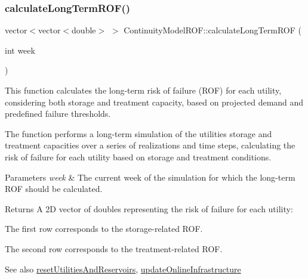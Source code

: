 \subsubsection{\texorpdfstring{calculate\+Long\+Term\+R\+O\+F()}{calculateLongTermROF()}}
{\footnotesize\ttfamily vector$<$vector$<$double$>$ $>$ Continuity\+Model\+R\+O\+F\+::calculate\+Long\+Term\+R\+OF (\begin{DoxyParamCaption}\item[{int}]{week }\end{DoxyParamCaption})}



This function calculates the long-\/term risk of failure (R\+OF) for each utility, considering both storage and treatment capacity, based on projected demand and predefined failure thresholds. 

The function performs a long-\/term simulation of the utilities\textquotesingle{} storage and treatment capacities over a series of realizations and time steps, calculating the risk of failure for each utility based on storage and treatment conditions.


\begin{DoxyParams}{Parameters}
{\em week} & The current week of the simulation for which the long-\/term R\+OF should be calculated.\\
\hline
\end{DoxyParams}
\begin{DoxyReturn}{Returns}
A 2D vector of doubles representing the risk of failure for each utility\+:
\begin{DoxyItemize}
\item The first row corresponds to the storage-\/related R\+OF.
\item The second row corresponds to the treatment-\/related R\+OF.
\end{DoxyItemize}
\end{DoxyReturn}
\begin{DoxySeeAlso}{See also}
\mbox{\hyperlink{classContinuityModelROF_acd72d71a29cef49c4de3d111378b76c7}{reset\+Utilities\+And\+Reservoirs}}, \mbox{\hyperlink{classContinuityModelROF_a06cf47a32d6793b0ee912deccf92fc5b}{update\+Online\+Infrastructure}} 
\end{DoxySeeAlso}
\mbox{\label{classContinuityModelROF_a0386963b5914aaaa145de60a2ff1f84e}} 
